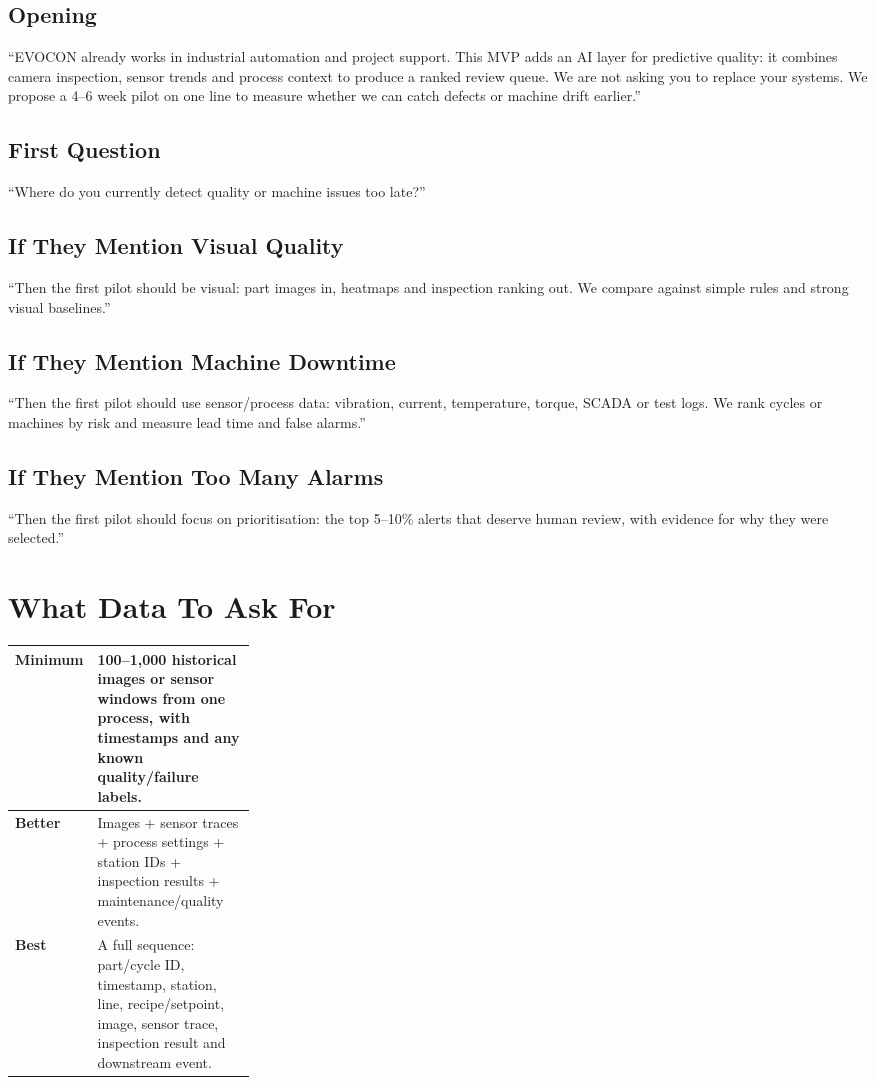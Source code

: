 \documentclass[11pt,a4paper]{article}
\begin{document}
\subsection*{Opening}
``EVOCON already works in industrial automation and project support. This MVP adds an AI layer for predictive quality: it combines camera inspection, sensor trends and process context to produce a ranked review queue. We are not asking you to replace your systems. We propose a 4--6 week pilot on one line to measure whether we can catch defects or machine drift earlier.''

\subsection*{First Question}
``Where do you currently detect quality or machine issues too late?''

\subsection*{If They Mention Visual Quality}
``Then the first pilot should be visual: part images in, heatmaps and inspection ranking out. We compare against simple rules and strong visual baselines.''

\subsection*{If They Mention Machine Downtime}
``Then the first pilot should use sensor/process data: vibration, current, temperature, torque, SCADA or test logs. We rank cycles or machines by risk and measure lead time and false alarms.''

\subsection*{If They Mention Too Many Alarms}
``Then the first pilot should focus on prioritisation: the top 5--10\% alerts that deserve human review, with evidence for why they were selected.''

\section{What Data To Ask For}
\begin{tabularx}{\linewidth}{@{}p{0.28\linewidth}Y@{}}
\toprule
\textbf{Minimum} & 100--1,000 historical images or sensor windows from one process, with timestamps and any known quality/failure labels. \\
\midrule
\textbf{Better} & Images + sensor traces + process settings + station IDs + inspection results + maintenance/quality events. \\
\midrule
\textbf{Best} & A full sequence: part/cycle ID, timestamp, station, line, recipe/setpoint, image, sensor trace, inspection result and downstream event. \\
\bottomrule
\end{tabularx}
\end{document}
